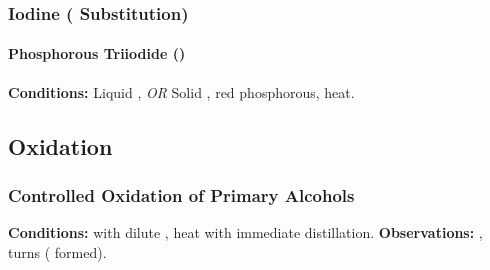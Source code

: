 


			\pagebreak
			\subsubsection{Iodine ( Substitution)}

				\paragraph{Phosphorous Triiodide ()}

				\vspace{1.5em}
				\vbox{\textbf{Conditions:}	\tabto{35mm}Liquid , \textit{OR}
											\tabto{35mm}Solid , {\color{Red}red} phosphorous, heat.}








		\pagebreak
		\subsection{Oxidation}

			\subsubsection{Controlled Oxidation of Primary Alcohols}

				\vspace{1.5em}
				\vbox{\textbf{Conditions:}	\tabto{35mm} with dilute ,
											\tabto{35mm}heat with immediate distillation.}
				\vspace{0.75em}
				\vbox{\textbf{Observations:}\tabto{35mm} , turns 
														( formed).}

